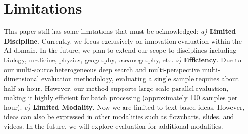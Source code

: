 

\section{Limitations}
This paper still has some limitations that must be acknowledged:
\textit{a)} \textbf{Limited Discipline}. Currently, we focus exclusively on innovation evaluation within the AI domain. In the future, we plan to extend our scope to disciplines including biology, medicine, physics, geography, oceanography, etc.
\textit{b)} \textbf{Efficiency}. Due to our multi-source heterogeneous deep search and multi-perspective multi-dimensional evaluation methodology, evaluating a single sample requires about half an hour. However, our method supports large-scale parallel evaluation, making it highly efficient for batch processing (approximately 100 samples per hour).
\textit{c)} \textbf{Limited Modality}. Now we are limited to text-based ideas. However, ideas can also be expressed in other modalities such as flowcharts, slides, and videos. In the future, we will explore evaluation for additional modalities.













